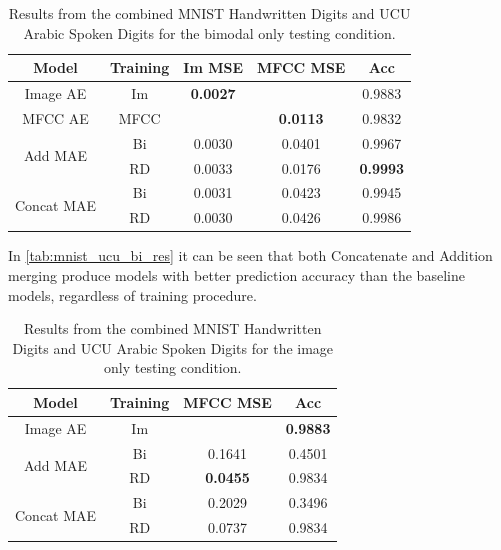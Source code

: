 \begin{table}
	\centering
		\begin{tabular}{|c|c|c|c|c|}
		\hline
		Model & Training & Im MSE & MFCC MSE &  Acc \\ \hline
				Image AE & Im & 	\textbf{0.0027}	&	       			& 	0.9883			\\ \hline		
				MFCC AE & MFCC & 		    		& 	\textbf{0.0113} &	0.9832			\\ \hline		
\multirow{2}{*}{Add MAE} & Bi & 	0.0030			&	0.0401			&	0.9967			\\ \cline{2-5}
						  & RD &	0.0033			&	0.0176			&	\textbf{0.9993}	\\ \hline	
		
\multirow{2}{*}{Concat MAE} & Bi & 0.0031			&	0.0423			&	0.9945			\\ \cline{2-5}		
							 & RD & 0.0030			&	0.0426			&	0.9986			\\ \hline
		\end{tabular}
		\caption{Results from the combined MNIST Handwritten Digits and UCU Arabic Spoken Digits for the bimodal only testing condition.}
		\label{tab:mnist_ucu_bi_res}

\end{table}

In \autoref{tab:mnist_ucu_bi_res} it can be seen that both Concatenate and Addition merging produce models with better prediction accuracy than the baseline models, regardless of training procedure.

\begin{table}
	\centering
		\begin{tabular}{|c|c|c|c|}
		\hline
		Model & Training &  MFCC MSE &  Acc \\ \hline
		Image AE & Im 		&  		    			& \textbf{0.9883}	\\ \hline		
\multirow{2}{*}{Add MAE} & Bi & 	0.1641			& 0.4501 			\\ \cline{2-4}
						  & RD & \textbf{0.0455}	& 0.9834 			\\ \hline	
		
\multirow{2}{*}{Concat MAE} & Bi & 	0.2029		&	0.3496 			\\ \cline{2-4}		
							 & RD & 	0.0737		&	0.9834 			\\ \hline
		\end{tabular}
		\caption{Results from the combined MNIST Handwritten Digits and UCU Arabic Spoken Digits for the image only testing condition.}
		\label{tab:mnist_ucu_im_res}

\end{table}

